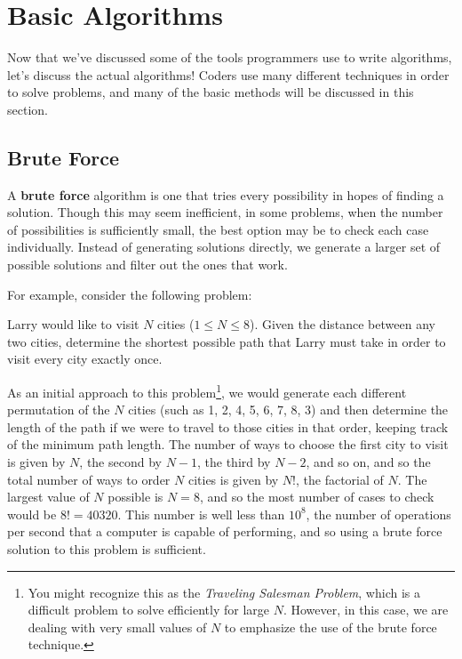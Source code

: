 \chapter{Basic Algorithms}

Now that we've discussed some of the tools programmers use to write algorithms, let's discuss the actual algorithms!  Coders use many different techniques in order to solve problems, and many of the basic methods will be discussed in this section.

\section{Brute Force}

A \textbf{brute force} algorithm is one that tries every possibility in hopes of finding a solution. Though this may seem inefficient, in some problems, when the number of possibilities is sufficiently small, the best option may be to check each case individually.  Instead of generating solutions directly, we generate a larger set of possible solutions and filter out the ones that work.

For example, consider the following problem:

\begin{Problem}
Larry would like to visit $ N $ cities ($1 \leq N \leq 8$).  Given the distance between any two cities, determine the shortest possible path that Larry must take in order to visit every city exactly once.
\end{Problem}

As an initial approach to this problem\footnote{You might recognize this as the \textit{Traveling Salesman Problem}, which is a difficult problem to solve efficiently for large $ N $.  However, in this case, we are dealing with very small values of $ N $ to emphasize the use of the brute force technique.}, we would generate each different permutation of the $ N $ cities (such as 1, 2, 4, 5, 6, 7, 8, 3) and then determine the length of the path if we were to travel to those cities in that order, keeping track of the minimum path length.  The number of ways to choose the first city to visit is given by $ N $, the second by $ N - 1 $, the third by $ N - 2 $, and so on, and so the total number of ways to order $ N $ cities is given by $ N! $, the factorial of $ N $.  The largest value of $ N $ possible is $ N = 8 $, and so the most number of cases to check would be $ 8! = 40320 $.  This number is well less than $ 10^8 $, the number of operations per second that a computer is capable of performing, and so using a brute force solution to this problem is sufficient.

